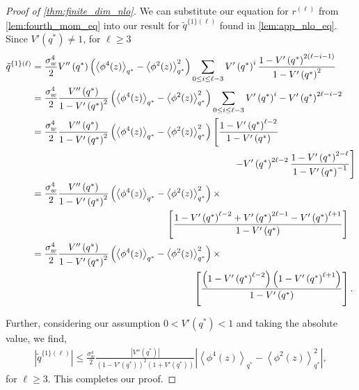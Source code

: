 \documentclass{article}
\theoremstyle{plain}
\theoremstyle{definition}
\theoremstyle{remark}
\begin{document}
\begin{proof}[Proof of \cref{thm:finite_dim_nlo}]

We can substitute our equation for $r^{(\ell)}$ from \cref{lem:fourth_mom_eq} into our result for $\tilde{q}^{\{1\}(\ell)}$ found in \cref{lem:app_nlo_eq}. Since $V'\left( q^{*}\right) \neq 1$, for $\ell \geq3$
\begin{align}
    \tilde{q}^{\{1\}(\ell)} &= \frac{\sigma_w^4}{2}V''\left( q^{*}\right)  \left( \left\langle \phi^4(z) \right\rangle_{q^{*}} - \left\langle \phi^2(z) \right\rangle^2_{q^{*}}\right)  \sum_{0\leq i \leq \ell-3} V' \left( q^{*} \right)^i \frac{1- V' \left( q^{*}\right)^{2(\ell-i-1)}}{1-V' \left( q^{*}\right)^{2}} \\
    &= \frac{\sigma_w^4}{2}\frac{V''\left( q^{*}\right)}{1-V' \left( q^{*}\right)^{2}}  \left( \left\langle \phi^4(z) \right\rangle_{q^{*}} - \left\langle \phi^2(z) \right\rangle^2_{q^{*}}\right) \sum_{0\leq i \leq \ell-3} V' \left( q^{*}\right)^i - V' \left( q^{*}\right)^{2\ell-i-2} \\
    &= \frac{\sigma_w^4}{2}\frac{V''\left( q^{*}\right)}{1-V' \left( q^{*}\right)^{2}}  \left( \left\langle \phi^4(z) \right\rangle_{q^{*}} - \left\langle \phi^2(z) \right\rangle^2_{q^{*}}\right) \left[ \frac{1-V' \left( q^{*}\right) ^{\ell-2}}{1-V' \left( q^{*}\right) } \right. \nonumber \\
    &\hspace{75mm}\left. - V' \left( q^{*}\right)^{2\ell-2} \frac{1-V' \left( q^{*} \right)^{2-\ell}}{1-V' \left( q^{*}\right)^{-1}} \right]\\
    &= \frac{\sigma_w^4}{2}\frac{V''\left( q^{*}\right)}{1-V' \left( q^{*}\right)^{2}}  \left( \left\langle \phi^4(z) \right\rangle_{q^{*}} - \left\langle \phi^2(z) \right\rangle^2_{q^{*}}\right) \times \nonumber \\
    &\hspace{50mm }\left[ \frac{1-V' \left( q^{*} \right)^{\ell-2}+ V' \left( q^{*}\right)^{2\ell-1}-V' \left( q^{*} \right)^{\ell+1}}{1-V' \left( q^{*}\right) } \right] \\
    &= \frac{\sigma_w^4}{2}\frac{V''\left( q^{*}\right)}{1-V' \left( q^{*}\right)^{2}}  \left( \left\langle \phi^4(z) \right\rangle_{q^{*}} - \left\langle \phi^2(z) \right\rangle^2_{q^{*}}\right) \times \nonumber \\
    &\hspace{60mm} \left[ \frac{ \left( 1-V' \left( q^{*}\right) ^{\ell-2} \right) \left( 1-V' \left( q^{*} \right)^{\ell+1} \right)}{1-V' \left( q^{*}\right) }  \right].
\end{align}

Further, considering our assumption $0<V' \left( q^{*}\right) <1$ and taking the absolute value, we find,
\begin{align}
    \left| \tilde{q}^{\{1\}(\ell)} \right| \leq \frac{\sigma_w^4}{2}\frac{\left|V''\left( q^{*}\right)\right|}{\left(1-V' \left( q^{*}\right)\right)^2\left(1+V' \left( q^{*}\right) \right)}  \left| \left\langle \phi^4(z) \right\rangle_{q^{*}} - \left\langle \phi^2(z) \right\rangle^2_{q^{*}}\right|,
\end{align}
for $\ell \geq 3$. This completes our proof.
\end{proof}
\end{document}
